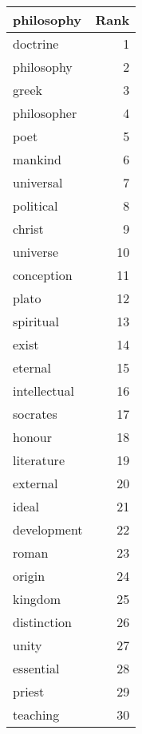 \begin{table}
\label{tab:philosophy_terms}
\begin{tabular}{lr}
\toprule
philosophy & Rank \\
\midrule
doctrine & 1 \\
philosophy & 2 \\
greek & 3 \\
philosopher & 4 \\
poet & 5 \\
mankind & 6 \\
universal & 7 \\
political & 8 \\
christ & 9 \\
universe & 10 \\
conception & 11 \\
plato & 12 \\
spiritual & 13 \\
exist & 14 \\
eternal & 15 \\
intellectual & 16 \\
socrates & 17 \\
honour & 18 \\
literature & 19 \\
external & 20 \\
ideal & 21 \\
development & 22 \\
roman & 23 \\
origin & 24 \\
kingdom & 25 \\
distinction & 26 \\
unity & 27 \\
essential & 28 \\
priest & 29 \\
teaching & 30 \\
\bottomrule
\end{tabular}
\end{table}
